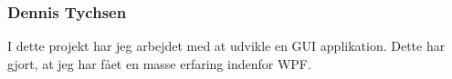 \subsubsection{Dennis Tychsen}
I dette projekt har jeg arbejdet med at udvikle en GUI applikation. Dette har gjort, at jeg har fået en masse erfaring indenfor WPF.